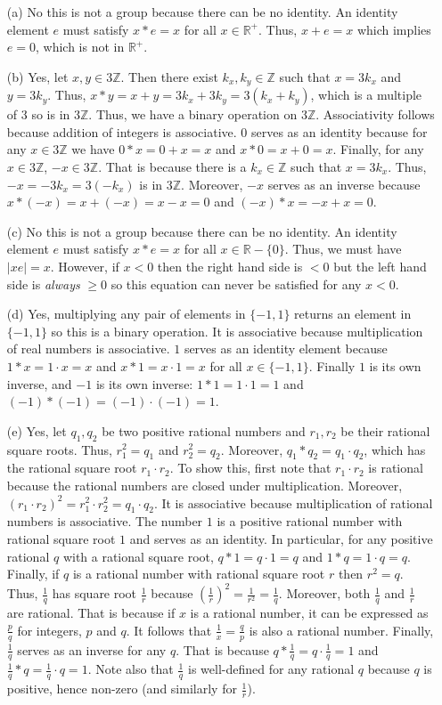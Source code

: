 \documentclass[12pt]{article}
\def\Z{{\mathbb Z}}        %
\def\R{{\mathbb R}}        %
\numberwithin{theorem}{section}
\numberwithin{equation}{section}
\numberwithin{remark}{section}
\numberwithin{definition}{section}
\numberwithin{theorem}{section}
\numberwithin{lemma}{section}
\numberwithin{example}{section}
\begin{document}
\begin{itemize}
	\item[(a)]{No this is not a group because there can be no identity. An identity element $e$ must satisfy $x*e=x$ for all $x\in\R^+$. Thus, $x+e=x$ which implies $e=0$, which is not in $\R^+$.}
	\item[(b)]{Yes, let $x,y\in3\Z$. Then there exist $k_x,k_y\in\Z$ such that $x=3k_x$ and $y=3k_y$. Thus, $x*y=x+y=3k_x+3k_y=3(k_x+k_y)$, which is a multiple of 3 so is in $3\Z$. Thus, we have a binary operation on $3\Z$. Associativity follows because addition of integers is associative. $0$ serves as an identity because for any $x\in3\Z$ we have $0*x=0+x=x$ and $x*0=x+0=x$. Finally, for any $x\in3\Z$, $-x\in3\Z$. That is because there is a $k_x\in\Z$ such that $x=3k_x$. Thus, $-x=-3k_x=3(-k_x)$ is in $3\Z$. Moreover, $-x$ serves as an inverse because $x*(-x)=x+(-x)=x-x=0$ and $(-x)*x=-x+x=0$.}
	\item[(c)]{No this is not a group because there can be no identity. An identity element $e$ must satisfy $x*e=x$ for all $x\in\R-\{0\}$. Thus, we must have $|xe|=x$. However, if $x<0$ then the right hand side is $<0$ but the left hand side is \emph{always} $\ge 0$ so this equation can never be satisfied for any $x<0$.}
	\item[(d)]{Yes, multiplying any pair of elements in $\{-1,1\}$ returns an element in $\{-1,1\}$ so this is a binary operation. It is associative because multiplication of real numbers is associative. $1$ serves as an identity element because $1*x=1\cdot x=x$ and $x*1=x\cdot 1=x$ for all $x\in\{-1,1\}$. Finally $1$ is its own inverse, and $-1$ is its own inverse: $1*1=1\cdot1=1$ and $(-1)*(-1)=(-1)\cdot(-1)=1$.}
	\item[(e)]{Yes, let $q_1,q_2$ be two positive rational numbers and $r_1,r_2$ be their rational square roots. Thus, $r_1^2=q_1$ and $r_2^2=q_2$. Moreover, $q_1*q_2=q_1\cdot q_2$, which has the rational square root $r_1\cdot r_2$. To show this, first note that $r_1\cdot r_2$ is rational because the rational numbers are closed under multiplication. Moreover, $(r_1\cdot r_2)^2=r_1^2\cdot r_2^2=q_1\cdot q_2$. It is associative because multiplication of rational numbers is associative. The number $1$ is a positive rational number with rational square root $1$ and serves as an identity. In particular, for any positive rational $q$ with a rational square root, $q*1=q\cdot1=q$ and $1*q=1\cdot q=q$. Finally, if $q$ is a rational number with rational square root $r$ then $r^2=q$. Thus, $\frac{1}{q}$ has square root $\frac{1}{r}$ because $\left(\frac{1}{r}\right)^2=\frac{1}{r^2}=\frac{1}{q}$. Moreover, both $\frac{1}{q}$ and $\frac{1}{r}$ are rational. That is because if $x$ is a rational number, it can be expressed as $\frac{p}{q}$ for integers, $p$ and $q$. It follows that $\frac{1}{x}=\frac{q}{p}$ is also a rational number. Finally, $\frac{1}{q}$ serves as an inverse for any $q$. That is because $q*\frac{1}{q}=q\cdot\frac{1}{q}=1$ and $\frac{1}{q}*q=\frac{1}{q}\cdot q=1$. Note also that $\frac{1}{q}$ is well-defined for any rational $q$ because $q$ is positive, hence non-zero (and similarly for $\frac{1}{r}$).}

\end{itemize}
\end{document}
